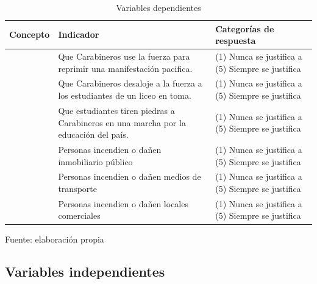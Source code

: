 \documentclass[12pt,twoside]{templates/facsothesis}
\begin{document}
\begin{table}[!h]

\caption{\label{tab:tab-dep}Variables dependientes}
\centering
\fontsize{10}{12}\selectfont
\begin{tabu} to 
\toprule
Concepto & Indicador & Categorías de respuesta\\
\midrule
 & Que Carabineros use la fuerza para reprimir una manifestación pacifica. & (1) Nunca se justifica a (5) Siempre se justifica\\
 & Que Carabineros desaloje a la fuerza a los estudiantes de un liceo en toma. & (1) Nunca se justifica a (5) Siempre se justifica\\
 & Que estudiantes tiren piedras a Carabineros en una marcha por la educación del país. & (1) Nunca se justifica a (5) Siempre se justifica\\
 & Personas incendien o dañen inmobiliario público & (1) Nunca se justifica a (5) Siempre se justifica\\
 & Personas incendien o dañen medios de transporte & (1) Nunca se justifica a (5) Siempre se justifica\\
 & Personas incendien o dañen locales comerciales & (1) Nunca se justifica a (5) Siempre se justifica\\
\bottomrule
\end{tabu}
\end{table}

\begin{center}
Fuente: elaboración propia
\end{center}

\hypertarget{variables-independientes}{%
\subsection{Variables independientes}\label{variables-independientes}}
\end{document}
